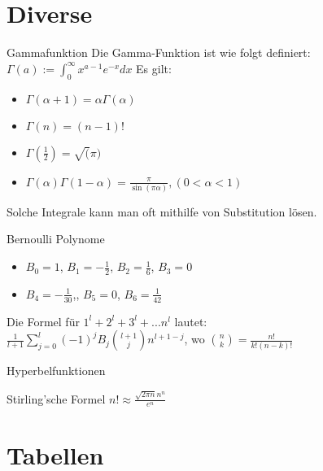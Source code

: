 \documentclass[a4paper,10pt]{article}
\begin{document}
\section{Diverse}
\begin{mainbox}{Gammafunktion}
  Die Gamma-Funktion ist wie folgt definiert: \\
  $\Gamma (a) := \int_{0}^{\infty} x^{a-1}e^{-x}dx$
  Es gilt: 
  \begin{itemize}
    \item $\Gamma(\alpha + 1) = \alpha\Gamma(\alpha)$
    \item $\Gamma(n) = (n-1)!$
    \item $\Gamma(\frac{1}{2}) = \sqrt(\pi)$
    \item $\Gamma(\alpha)\Gamma(1-\alpha) = \frac{\pi}{\sin(\pi\alpha)}, (0 < \alpha < 1 )$
  \end{itemize}
  Solche Integrale kann man oft mithilfe von Substitution lösen.
\end{mainbox}

\begin{mainbox}{Bernoulli Polynome}
  \begin{itemize}
    \item $B_0 = 1$, $B_1 = -\frac{1}{2}$, $B_2 = \frac{1}{6}$, $B_3 = 0$
    \item $B_4 = -\frac{1}{30}$,, $B_5 = 0$, $B_6 = \frac{1}{42}$
  \end{itemize}
  Die Formel für $1^l + 2^l + 3^l + ... n^l$ lautet:\\
  $\frac{1}{l+1}\sum\limits_{j=0}^{l}(-1)^j B_j\binom{l+1}{j}n^{l+1-j}$,
  wo $\binom{n}{k} = \frac{n!}{k!(n-k)!}$  
\end{mainbox}

\begin{mainbox}{Hyperbelfunktionen}
  \begin{center}
  \end{center}
\end{mainbox}

\begin{subbox}{Stirling'sche Formel}
  $n! \approx \frac{\sqrt{2\pi n}n^n}{e^n}$
\end{subbox}

\section{Tabellen}
\end{document}
